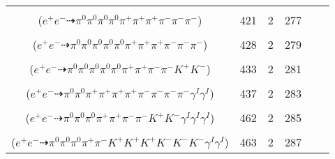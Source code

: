 \documentclass[landscape]{article}
\newcounter{rownumbers}
\newcommand\rn{\stepcounter{rownumbers}\arabic{rownumbers}}
\newcommand{\EOL}{\\} %
\newcommand{\topoTags}[1]{#1} %
\begin{document}
\begin{longtable}{clcccc}
\rn & \makecell[l]{ $ 
e^{+} e^{-} \rightarrow \pi^{0} \pi^{0} \pi^{0} \pi^{+} \pi^{+} \pi^{+} \pi^{-} \pi^{-} \rho^{-} ,
\rho^{-} \rightarrow \pi^{0} \pi^{-} 
$ \\ ($
e^{+} e^{-} \dashrightarrow \pi^{0} \pi^{0} \pi^{0} \pi^{0} \pi^{+} \pi^{+} \pi^{+} \pi^{-} \pi^{-} \pi^{-} 
$) } & \topoTags{421 & }2 & 277 \EOL

\rn & \makecell[l]{ $ 
e^{+} e^{-} \rightarrow \pi^{0} \pi^{0} \pi^{+} \pi^{-} \rho^{+} \rho^{-} \omega ,
\rho^{+} \rightarrow \pi^{0} \pi^{+} ,
\rho^{-} \rightarrow \pi^{0} \pi^{-} ,
\omega \rightarrow \pi^{0} \pi^{+} \pi^{-} 
$ \\ ($
e^{+} e^{-} \dashrightarrow \pi^{0} \pi^{0} \pi^{0} \pi^{0} \pi^{0} \pi^{+} \pi^{+} \pi^{+} \pi^{-} \pi^{-} \pi^{-} 
$) } & \topoTags{428 & }2 & 279 \EOL

\rn & \makecell[l]{ $ 
e^{+} e^{-} \rightarrow \pi^{0} \pi^{0} \pi^{+} \rho^{-} \omega K^{-} K^{*+} ,
\rho^{-} \rightarrow \pi^{0} \pi^{-} ,
\omega \rightarrow \pi^{0} \pi^{+} \pi^{-} ,
K^{*+} \rightarrow \pi^{0} K^{+} 
$ \\ ($
e^{+} e^{-} \dashrightarrow \pi^{0} \pi^{0} \pi^{0} \pi^{0} \pi^{0} \pi^{+} \pi^{+} \pi^{-} \pi^{-} K^{+} K^{-} 
$) } & \topoTags{433 & }2 & 281 \EOL

\rn & \makecell[l]{ $ 
e^{+} e^{-} \rightarrow \rho^{0} \pi^{+} \pi^{-} \pi^{-} \rho^{+} \omega \gamma^{I} \gamma^{I} ,
\rho^{0} \rightarrow \pi^{+} \pi^{-} ,
\rho^{+} \rightarrow \pi^{0} \pi^{+} ,
\omega \rightarrow \pi^{0} \pi^{+} \pi^{-} 
$ \\ ($
e^{+} e^{-} \dashrightarrow \pi^{0} \pi^{0} \pi^{+} \pi^{+} \pi^{+} \pi^{+} \pi^{-} \pi^{-} \pi^{-} \pi^{-} \gamma^{I} \gamma^{I} 
$) } & \topoTags{437 & }2 & 283 \EOL

\rn & \makecell[l]{ $ 
e^{+} e^{-} \rightarrow \pi^{0} \pi^{0} \pi^{+} \pi^{+} \pi^{-} \rho^{-} K^{+} K^{-} \gamma^{I} \gamma^{I} \gamma^{I} ,
\rho^{-} \rightarrow \pi^{0} \pi^{-} 
$ \\ ($
e^{+} e^{-} \dashrightarrow \pi^{0} \pi^{0} \pi^{0} \pi^{+} \pi^{+} \pi^{-} \pi^{-} K^{+} K^{-} \gamma^{I} \gamma^{I} \gamma^{I} 
$) } & \topoTags{462 & }2 & 285 \EOL

\rn & \makecell[l]{ $ 
e^{+} e^{-} \rightarrow \pi^{0} \pi^{0} \pi^{0} \pi^{+} K^{*} K^{+} K^{-} K^{-} \phi \gamma^{I} \gamma^{I} ,
K^{*} \rightarrow \pi^{-} K^{+} ,
\phi \rightarrow K^{+} K^{-} 
$ \\ ($
e^{+} e^{-} \dashrightarrow \pi^{0} \pi^{0} \pi^{0} \pi^{+} \pi^{-} K^{+} K^{+} K^{+} K^{-} K^{-} K^{-} \gamma^{I} \gamma^{I} 
$) } & \topoTags{463 & }2 & 287 \EOL


\end{longtable}
\end{document}

